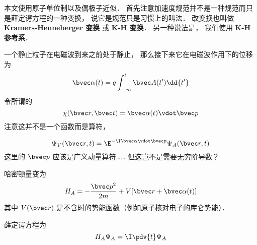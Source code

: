 
\begin{issues}
\issueDraft
\end{issues}


本文使用原子单位制以及偶极子近似． 首先注意加速度规范并不是一种规范而只是薛定谔方程的一种变换， 说它是规范只是习惯上的叫法． 改变换也叫做 \textbf{Kramers-Henneberger 变换} 或 \textbf{K-H 变换}． 另一种说法是， 我们使用 \textbf{K-H 参考系}．

一个静止粒子在电磁波到来之前处于静止， 那么接下来它在电磁波作用下的位移为
\begin{equation}
\bvec \alpha(t) = q\int_{-\infty}^t \bvec A(t') \dd{t'}
\end{equation}
令所谓的
\begin{equation}
\chi(\bvec r, \bvec t) = \bvec \alpha(t) \vdot \bvec p
\end{equation}
注意这并不是一个函数而是算符， 

\begin{equation}
\Psi_V(\bvec r, t) = \E^{-\I \bvec \alpha \vdot \bvec p} \Psi_A(\bvec r, t)
\end{equation}
这里的 $\bvec p$ 应该是广义动量算符…… 但这岂不是需要无穷阶导数？

哈密顿量变为
\begin{equation}
H_A = -\frac{\bvec p^2}{2m} + V[\bvec r + \bvec \alpha(t)]
\end{equation}
其中 $V(\bvec r)$ 是不含时的势能函数（例如原子核对电子的库仑势能）．

薛定谔方程为
\begin{equation}
H_A \Psi_A = \I \pdv{t} \Psi_A
\end{equation}
